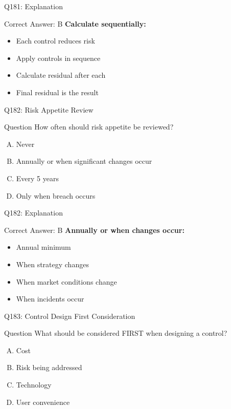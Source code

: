\documentclass{beamer}
\begin{document}
	\begin{frame}{Q181: Explanation}
		\begin{block}{Correct Answer: B}
			\textbf{Calculate sequentially:}
			\begin{itemize}
				\item Each control reduces risk
				\item Apply controls in sequence
				\item Calculate residual after each
				\item Final residual is the result
			\end{itemize}
		\end{block}
	\end{frame}
	
	\begin{frame}{Q182: Risk Appetite Review}
		\begin{block}{Question}
			How often should risk appetite be reviewed?
		\end{block}
		\begin{enumerate}[(A)]
			\item Never
			\item Annually or when significant changes occur
			\item Every 5 years
			\item Only when breach occurs
		\end{enumerate}
	\end{frame}
	
	\begin{frame}{Q182: Explanation}
		\begin{block}{Correct Answer: B}
			\textbf{Annually or when changes occur:}
			\begin{itemize}
				\item Annual minimum
				\item When strategy changes
				\item When market conditions change
				\item When incidents occur
			\end{itemize}
		\end{block}
	\end{frame}
	
	\begin{frame}{Q183: Control Design First Consideration}
		\begin{block}{Question}
			What should be considered FIRST when designing a control?
		\end{block}
		\begin{enumerate}[(A)]
			\item Cost
			\item Risk being addressed
			\item Technology
			\item User convenience
		\end{enumerate}
	\end{frame}
	
\end{document}
